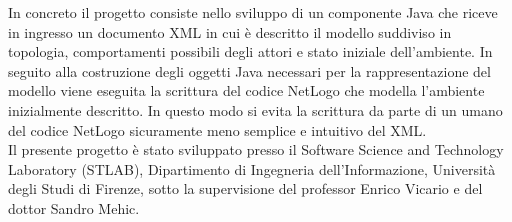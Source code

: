 In concreto il progetto consiste nello sviluppo di un componente Java che riceve in ingresso un documento XML in cui è descritto il modello suddiviso in topologia, comportamenti possibili degli attori e stato iniziale dell'ambiente. In seguito alla costruzione degli oggetti Java necessari per la rappresentazione del modello viene eseguita la scrittura del codice NetLogo che modella l'ambiente inizialmente descritto. In questo modo si evita la scrittura da parte di un umano del codice NetLogo sicuramente meno semplice e intuitivo del XML.\\
Il presente progetto è stato sviluppato presso il Software Science and Technology Laboratory (STLAB), Dipartimento di Ingegneria dell'Informazione, Università degli Studi di Firenze, sotto la supervisione del professor Enrico Vicario e del dottor Sandro Mehic.\\
 